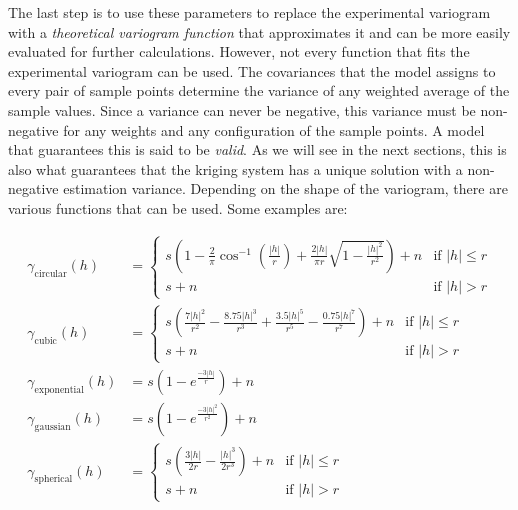 The last step is to use these parameters to replace the experimental variogram with a \emph{theoretical variogram function} that approximates it and can be more easily evaluated for further calculations.
However, not every function that fits the experimental variogram can be used.
The covariances that the model assigns to every pair of sample points determine the variance of any weighted average of the sample values.
Since a variance can never be negative, this variance must be non-negative for any weights and any configuration of the sample points.
A model that guarantees this is said to be \emph{valid}.
As we will see in the next sections, this is also what guarantees that the kriging system has a unique solution with a non-negative estimation variance.
Depending on the shape of the variogram, there are various functions that can be used.
Some examples are:

\begin{align}
\gamma_\mathrm{circular}(h) &= \begin{cases}
  s \left(1-\frac{2}{\pi}\cos^{-1}\left(\frac{|h|}{r}\right)+\frac{2|h|}{\pi r}\sqrt{1-\frac{|h|^2}{r^2}}\right) + n & \text{if } |h| \leq r \\
  s + n & \text{if } |h| > r
  \end{cases}\\
\gamma_\mathrm{cubic}(h) &= \begin{cases}
  s \left(\frac{7|h|^2}{r^2}-\frac{8.75|h|^3}{r^3}+\frac{3.5|h|^5}{r^5}-\frac{0.75|h|^7}{r^7}\right) + n & \text{if } |h| \leq r \\
  s + n & \text{if } |h| > r
  \end{cases}\\
\gamma_\mathrm{exponential}(h) &= s \left(1 - e^\frac{-3|h|}{r}\right) + n \\
\gamma_\mathrm{gaussian}(h) &= s \left(1 - e^\frac{-3|h|^2}{r^2}\right) + n \\
\gamma_\mathrm{spherical}(h) &= \begin{cases} 
   s \left(\frac{3|h|}{2r} - \frac{|h|^3}{2r^3}\right) + n & \text{if } |h| \leq r \\
   s + n & \text{if } |h| > r
  \end{cases}
\end{align}

